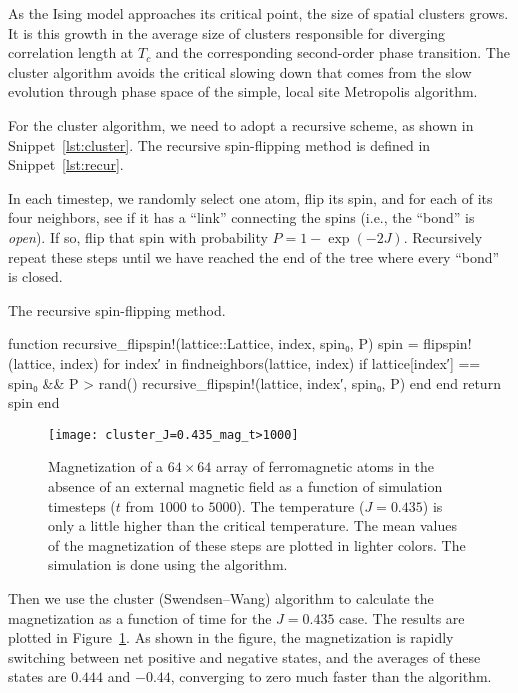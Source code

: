 As the Ising model approaches its critical point, the size of spatial clusters grows. It is
this growth in the average size of clusters responsible for diverging correlation
length at \(T_c\) and the corresponding second-order phase transition. The cluster algorithm
avoids the critical slowing down that comes from the slow evolution through phase space of
the simple, local site Metropolis algorithm.

For the cluster algorithm, we need to adopt a recursive scheme, as shown in
Snippet~\ref{lst:cluster}. The recursive spin-flipping method is defined in
Snippet~\ref{lst:recur}.

In each timestep, we randomly select one atom, flip its spin, and for each of its four
neighbors, see if it has a ``link'' connecting the spins (i.e., the ``bond'' is \emph{open}).
If so, flip that spin with probability \(P = 1 - \exp(-2J)\).
Recursively repeat these steps until we have reached the end of the tree where
every ``bond'' is closed.

\begin{algorithm}
    \caption{The recursive spin-flipping method.}
    \label{lst:recur}
    \begin{juliacode}
        function recursive_flipspin!(lattice::Lattice, index, spin₀, P)
            spin = flipspin!(lattice, index)
            for index′ in findneighbors(lattice, index)
                if lattice[index′] == spin₀ && P > rand()
                    recursive_flipspin!(lattice, index′, spin₀, P)
                end
            end
            return spin
        end
    \end{juliacode}
\end{algorithm}

\begin{figure}[hbt]
    \centering
    \texttt{[image: cluster\_J=0.435\_mag\_t>1000]}
    \caption{Magnetization of a \(64 \times 64\) array of ferromagnetic atoms in the absence
        of an external magnetic field as a function of simulation timesteps (\(t\) from
        \(1000\) to \(5000\)). The temperature (\(J = 0.435\)) is only a little higher than
        the critical temperature. The mean values of the magnetization of these steps are
        plotted in lighter colors. The simulation is done using the 
        algorithm.}
    \label{fig:mag_J=0.435_cluster}
\end{figure}

Then we use the cluster (Swendsen--Wang) algorithm to calculate the magnetization as a
function of time for the \(J = 0.435\) case. The results are plotted in
Figure~\ref{fig:mag_J=0.435_cluster}. As shown in the figure, the magnetization is rapidly
switching between net positive and negative states, and the averages of these states are
\(0.444\) and \(-0.44\), converging to zero much faster than the  algorithm.
